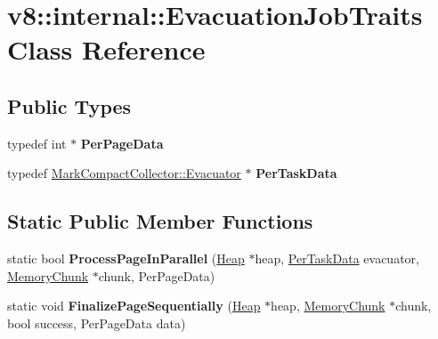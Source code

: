 \hypertarget{classv8_1_1internal_1_1_evacuation_job_traits}{}\section{v8\+:\+:internal\+:\+:Evacuation\+Job\+Traits Class Reference}
\label{classv8_1_1internal_1_1_evacuation_job_traits}
\subsection*{Public Types}
\begin{DoxyCompactItemize}
\item 
typedef int $\ast$ {\bfseries Per\+Page\+Data}\hypertarget{classv8_1_1internal_1_1_evacuation_job_traits_a46455801a687b9e88da469dcf5d0fb9a}{}\label{classv8_1_1internal_1_1_evacuation_job_traits_a46455801a687b9e88da469dcf5d0fb9a}

\item 
typedef \hyperlink{classv8_1_1internal_1_1_mark_compact_collector_1_1_evacuator}{Mark\+Compact\+Collector\+::\+Evacuator} $\ast$ {\bfseries Per\+Task\+Data}\hypertarget{classv8_1_1internal_1_1_evacuation_job_traits_aafc096adcf4ab8dafb0f78286c8bb2dc}{}\label{classv8_1_1internal_1_1_evacuation_job_traits_aafc096adcf4ab8dafb0f78286c8bb2dc}

\end{DoxyCompactItemize}
\subsection*{Static Public Member Functions}
\begin{DoxyCompactItemize}
\item 
static bool {\bfseries Process\+Page\+In\+Parallel} (\hyperlink{classv8_1_1internal_1_1_heap}{Heap} $\ast$heap, \hyperlink{classv8_1_1internal_1_1_mark_compact_collector_1_1_evacuator}{Per\+Task\+Data} evacuator, \hyperlink{classv8_1_1internal_1_1_memory_chunk}{Memory\+Chunk} $\ast$chunk, Per\+Page\+Data)\hypertarget{classv8_1_1internal_1_1_evacuation_job_traits_a24ba514c41c3cb2d4289b4c619058c09}{}\label{classv8_1_1internal_1_1_evacuation_job_traits_a24ba514c41c3cb2d4289b4c619058c09}

\item 
static void {\bfseries Finalize\+Page\+Sequentially} (\hyperlink{classv8_1_1internal_1_1_heap}{Heap} $\ast$heap, \hyperlink{classv8_1_1internal_1_1_memory_chunk}{Memory\+Chunk} $\ast$chunk, bool success, Per\+Page\+Data data)\hypertarget{classv8_1_1internal_1_1_evacuation_job_traits_a4c291013e18a8c95f729df5e821d1765}{}\label{classv8_1_1internal_1_1_evacuation_job_traits_a4c291013e18a8c95f729df5e821d1765}

\end{DoxyCompactItemize}
